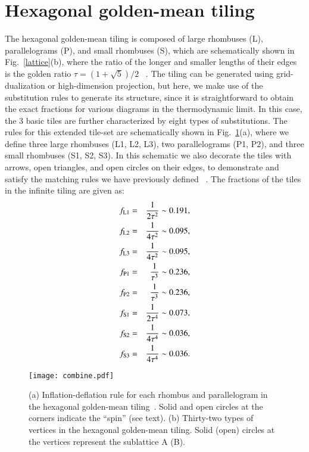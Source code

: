 \documentclass[aps,twocolumn,pra,superscriptaddress,amsmath,amssymb]{revtex4-1}
\begin{document}
\section{Hexagonal golden-mean tiling}\label{sec:tiling}
The hexagonal golden-mean tiling is composed of large rhombuses (L), parallelograms (P),
and small rhombuses (S),
which are schematically shown in Fig.~\ref{lattice}(b), where the ratio of the longer and smaller lengths of their edges is the golden ratio $\tau = (1+\sqrt{5})/2$ ~\cite{Sam}. The tiling can be generated using grid-dualization or high-dimension projection, but here, we make use of the substitution rules
to generate its structure,
since it is straightforward to obtain the exact fractions for various diagrams in the thermodynamic limit.
In this case, the 3 basic tiles are further characterized by eight types of substitutions. The rules for this extended tile-set are schematically shown in Fig.~\ref{vertices}(a), where we define three large rhombuses (L1, L2, L3),
two parallelograms (P1, P2), 
and three small rhombuses (S1, S2, S3). In this schematic we also decorate the tiles with arrows, open triangles, and open circles on their edges, to demonstrate and satisfy the matching rules we have previously defined ~\cite{Sam}. The fractions of the tiles in the infinite tiling are given as:
\begin{eqnarray}
  f_{\rm L1}&=&\frac{1}{2\tau^2}\sim 0.191,\label{eq:L1}\\
  f_{\rm L2}&=&\frac{1}{4\tau^2}\sim 0.095,\\
  f_{\rm L3}&=&\frac{1}{4\tau^2}\sim 0.095,\\
  f_{\rm P1}&=&\frac{1}{\tau^3}\sim 0.236,\\
  f_{\rm P2}&=&\frac{1}{\tau^3}\sim 0.236,\\
  f_{\rm S1}&=&\frac{1}{2\tau^4}\sim 0.073,\\
  f_{\rm S2}&=&\frac{1}{4\tau^4}\sim 0.036,\\
  f_{\rm S3}&=&\frac{1}{4\tau^4}\sim 0.036.\label{eq:S3}
\end{eqnarray}


  \begin{figure*}
    \texttt{[image: combine.pdf]}
    \caption{
      (a) Inflation-deflation rule for each rhombus and parallelogram
      in the hexagonal golden-mean tiling~\cite{Sam}.
      Solid and open circles at the corners indicate the ``spin'' (see text).
      (b) Thirty-two types of vertices in the hexagonal golden-mean tiling.
      Solid (open) circles at the vertices represent the sublattice A (B).
    }
    \label{vertices}
  \end{figure*}
\end{document}
